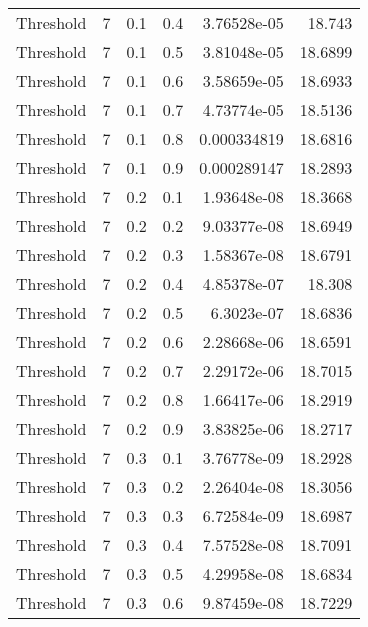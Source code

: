 \documentclass{article}
\begin{document}
\begin{longtable}[H]{lrrrrr}
 Threshold      &       7 &   0.1 &            0.4 &   3.76528e-05 &         18.743  \\
 Threshold      &       7 &   0.1 &            0.5 &   3.81048e-05 &         18.6899 \\
 Threshold      &       7 &   0.1 &            0.6 &   3.58659e-05 &         18.6933 \\
 Threshold      &       7 &   0.1 &            0.7 &   4.73774e-05 &         18.5136 \\
 Threshold      &       7 &   0.1 &            0.8 &   0.000334819 &         18.6816 \\
 Threshold      &       7 &   0.1 &            0.9 &   0.000289147 &         18.2893 \\
 Threshold      &       7 &   0.2 &            0.1 &   1.93648e-08 &         18.3668 \\
 Threshold      &       7 &   0.2 &            0.2 &   9.03377e-08 &         18.6949 \\
 Threshold      &       7 &   0.2 &            0.3 &   1.58367e-08 &         18.6791 \\
 Threshold      &       7 &   0.2 &            0.4 &   4.85378e-07 &         18.308  \\
 Threshold      &       7 &   0.2 &            0.5 &   6.3023e-07  &         18.6836 \\
 Threshold      &       7 &   0.2 &            0.6 &   2.28668e-06 &         18.6591 \\
 Threshold      &       7 &   0.2 &            0.7 &   2.29172e-06 &         18.7015 \\
 Threshold      &       7 &   0.2 &            0.8 &   1.66417e-06 &         18.2919 \\
 Threshold      &       7 &   0.2 &            0.9 &   3.83825e-06 &         18.2717 \\
 Threshold      &       7 &   0.3 &            0.1 &   3.76778e-09 &         18.2928 \\
 Threshold      &       7 &   0.3 &            0.2 &   2.26404e-08 &         18.3056 \\
 Threshold      &       7 &   0.3 &            0.3 &   6.72584e-09 &         18.6987 \\
 Threshold      &       7 &   0.3 &            0.4 &   7.57528e-08 &         18.7091 \\
 Threshold      &       7 &   0.3 &            0.5 &   4.29958e-08 &         18.6834 \\
 Threshold      &       7 &   0.3 &            0.6 &   9.87459e-08 &         18.7229 \\

\end{longtable}
\end{document}
